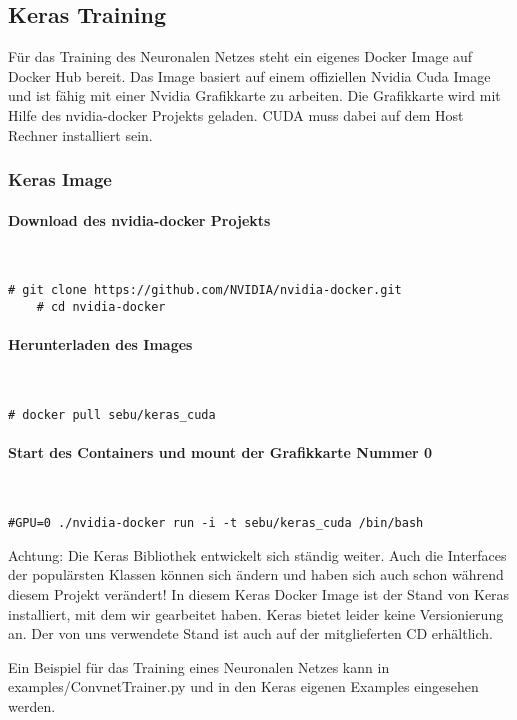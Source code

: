 \newpage
\subsection{Keras Training}
Für das Training des Neuronalen Netzes steht ein eigenes Docker Image \cite{DokerKeras} auf Docker Hub bereit. Das Image basiert auf einem offiziellen Nvidia Cuda Image und ist fähig mit einer Nvidia Grafikkarte zu arbeiten. Die Grafikkarte wird mit Hilfe des nvidia-docker Projekts geladen. CUDA muss dabei auf dem Host Rechner installiert sein.


\subsubsection{Keras Image}
\paragraph{Download des nvidia-docker Projekts}\mbox{}\\
\begin{lstlisting}[style=BashInputStyle]
	# git clone https://github.com/NVIDIA/nvidia-docker.git
	# cd nvidia-docker
\end{lstlisting}

\paragraph{Herunterladen des Images}\mbox{}\\
\begin{lstlisting}[style=BashInputStyle]
	# docker pull sebu/keras_cuda
\end{lstlisting}	

\paragraph{Start des Containers und mount der Grafikkarte Nummer 0}\mbox{}\\
\begin{lstlisting}[style=BashInputStyle]
	#GPU=0 ./nvidia-docker run -i -t sebu/keras_cuda /bin/bash
\end{lstlisting}

Achtung: Die Keras Bibliothek entwickelt sich ständig weiter. Auch die Interfaces der populärsten Klassen können sich ändern und haben sich auch schon während diesem Projekt verändert! In diesem Keras Docker Image ist der Stand von Keras installiert, mit dem wir gearbeitet haben. Keras bietet leider keine Versionierung an. Der von uns verwendete Stand ist auch auf der mitglieferten CD erhältlich.

Ein Beispiel für das Training eines Neuronalen Netzes kann in examples/ConvnetTrainer.py und in den Keras eigenen Examples eingesehen werden.